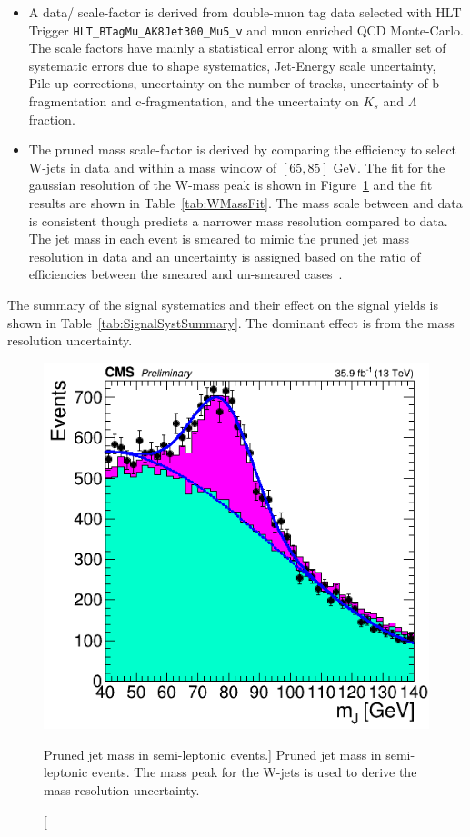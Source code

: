 \begin{itemize}
\item A data/ scale-factor is derived from double-muon tag data selected with HLT Trigger \texttt{HLT\_BTagMu\_AK8Jet300\_Mu5\_v} and muon enriched QCD Monte-Carlo. The scale factors have mainly a statistical error along with a smaller set of systematic errors due to shape systematics, Jet-Energy scale uncertainty, Pile-up corrections, uncertainty on the number of tracks, uncertainty of b-fragmentation and  c-fragmentation, and the uncertainty on $K_{s}$ and $\Lambda$ fraction. 
\item The pruned mass scale-factor is derived by comparing the efficiency to select W-jets in data and  within a mass window of $\left[65,85\right]$ GeV.  The fit for the gaussian resolution of the W-mass peak is shown in Figure~\ref{fig:WMassPeak} and the fit results are shown in Table~\ref{tab:WMassFit}. The mass scale between  and data is consistent though  predicts a narrower mass resolution compared to data. The jet mass in each event is smeared to mimic the pruned jet mass resolution in data and an uncertainty is assigned based on the ratio of efficiencies between the smeared and un-smeared cases~\cite{CMS_AN_2016-215}.
\end{itemize} 

The summary of the signal systematics and their effect on the signal yields is shown in Table~\ref{tab:SignalSystSummary}. The dominant effect is from the mass resolution uncertainty.


\begin{figure}[hbp!]
\begin{center}
\includegraphics[width=0.5\linewidth]{figs/WMassPeakDataMC.png}
\end{center}
\caption
[Pruned jet mass in semi-leptonic \ttbar events.]
{Pruned jet mass in semi-leptonic \ttbar events. The mass peak for the W-jets is used to derive the mass resolution uncertainty.}
\label{fig:WMassPeak}
\end{figure}

